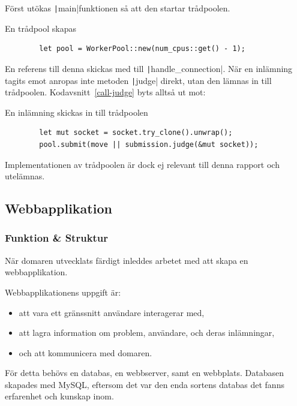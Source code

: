 \documentclass{article}
\renewcommand*\listingscaption{Kodavsnitt}
\newcommand*\coderef[1]{\listingscaption~\ref{#1}}
\begin{document}
Först utökas \texttt|main|funktionen så att den startar trådpoolen.

\begin{listing}[H]
	\caption{En trådpool skapas}
	\begin{verbatim}
		let pool = WorkerPool::new(num_cpus::get() - 1);
	\end{verbatim}
\end{listing}

En referens till denna skickas med till
\texttt|handle_connection|. När en
inlämning tagits emot anropas inte metoden \texttt|judge| direkt, utan den
lämnas in till trådpoolen. \coderef{call-judge} byts alltså ut mot:

\begin{listing}[H]
	\caption{En inlämning skickas in till trådpoolen}
	\begin{verbatim}
        let mut socket = socket.try_clone().unwrap();
        pool.submit(move || submission.judge(&mut socket));
	\end{verbatim}
\end{listing}

Implementationen av trådpoolen är dock ej relevant till denna rapport och
utelämnas.

\subsection{Webbapplikation}

\subsubsection{Funktion \& Struktur}

När domaren utvecklats färdigt inleddes arbetet med att skapa en
webbapplikation.

Webbapplikationens uppgift är:

\begin{itemize}
	\item att vara ett gränssnitt användare interagerar med,
	\item att lagra information om problem, användare, och deras inlämningar,
	\item och att kommunicera med domaren.
\end{itemize}

För detta behövs en databas, en webbserver, samt en webbplats. Databasen
skapades med MySQL, eftersom det var den enda sortens databas det fanns
erfarenhet och kunskap inom.
\end{document}
